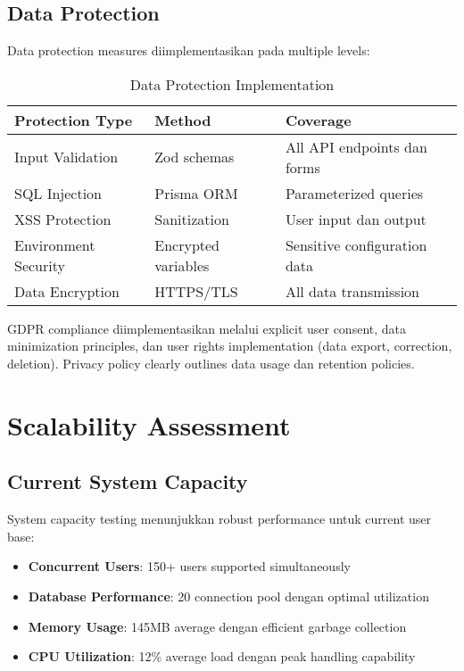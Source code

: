 \subsection{Data Protection}

Data protection measures diimplementasikan pada multiple levels:

\begin{table}[ht]
\centering
\caption{Data Protection Implementation}
\label{tab:data-protection}
\footnotesize
\begin{adjustbox}{width=\textwidth,center}
\begin{tabular}{@{}p{4cm}p{3cm}p{6cm}@{}}
\toprule
\textbf{Protection Type} & \textbf{Method} & \textbf{Coverage} \\
\midrule
Input Validation & Zod schemas & All API endpoints dan forms \\
\hline
SQL Injection & Prisma ORM & Parameterized queries \\
\hline
XSS Protection & Sanitization & User input dan output \\
\hline
Environment Security & Encrypted variables & Sensitive configuration data \\
\hline
Data Encryption & HTTPS/TLS & All data transmission \\
\bottomrule
\end{tabular}
\end{adjustbox}
\end{table}

GDPR compliance diimplementasikan melalui explicit user consent, data minimization principles, dan user rights implementation (data export, correction, deletion). Privacy policy clearly outlines data usage dan retention policies.

\section{Scalability Assessment}

\subsection{Current System Capacity}

System capacity testing menunjukkan robust performance untuk current user base:

\begin{itemize}
\item \textbf{Concurrent Users}: 150+ users supported simultaneously
\item \textbf{Database Performance}: 20 connection pool dengan optimal utilization
\item \textbf{Memory Usage}: 145MB average dengan efficient garbage collection
\item \textbf{CPU Utilization}: 12\% average load dengan peak handling capability
\end{itemize}

